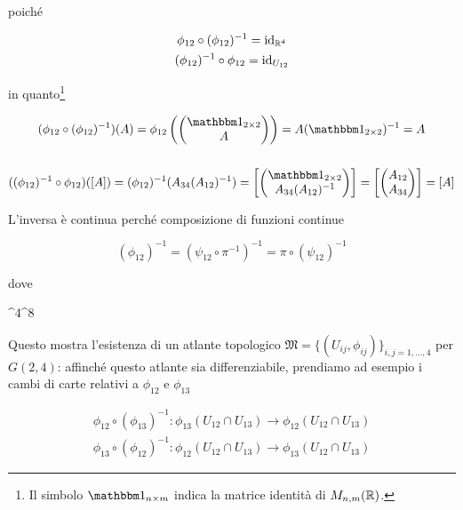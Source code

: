 poiché

\begin{gather}
	\phi_{12} \circ (\phi_{12})^{-1} = \operatorname{id}_{\mathbb{R}^{4}}\\
	(\phi_{12})^{-1} \circ \phi_{12} = \operatorname{id}_{U_{12}}
\end{gather}

in quanto\footnote{%
	Il simbolo $ \bigone_{n \times m} $ indica la matrice identità di $ M_{n,m}(\mathbb{R}) $.%
}

\begin{gather}
	(\phi_{12} \circ (\phi_{12})^{-1})(A) = \phi_{12} \left( \pmqty{ \bigone_{2 \times 2} \\ A } \right) = A (\bigone_{2 \times 2})^{-1} = A\\\\
	((\phi_{12})^{-1} \circ \phi_{12})([A]) = (\phi_{12})^{-1}(A_{34} (A_{12})^{-1}) = \left[ \pmqty{ \bigone_{2 \times 2} \\ A_{34} (A_{12})^{-1} } \right] = \left[ \pmqty{ A_{12} \\ A_{34} } \right] = [A]
\end{gather}

L'inversa è continua perché composizione di funzioni continue

\begin{equation}
	(\phi_{12})^{-1} = (\psi_{12} \circ \pi^{-1})^{-1} = \pi \circ (\psi_{12})^{-1}
\end{equation}

dove

	{\R^{4}}{\R^{8}}
	{}{}

Questo mostra l'esistenza di un atlante topologico $ \mathfrak{M} = \{(U_{ij},\phi_{ij})\}_{i,j=1,\dots,4} $ per $ G(2,4) $: affinché questo atlante sia differenziabile, prendiamo ad esempio i cambi di carte relativi a $ \phi_{12} $ e $ \phi_{13} $

\begin{gather}
	\phi_{12} \circ (\phi_{13})^{-1} : \phi_{13} (U_{12} \cap U_{13}) \to \phi_{12} (U_{12} \cap U_{13})\\
	\phi_{13} \circ (\phi_{12})^{-1} : \phi_{12} (U_{12} \cap U_{13}) \to \phi_{13} (U_{12} \cap U_{13})
\end{gather}

